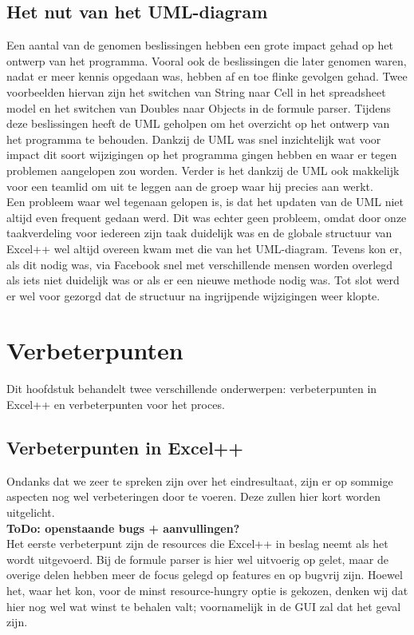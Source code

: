 \documentclass[a4paper,11pt]{article}
\begin{document}
\subsection{Het nut van het UML-diagram}
Een aantal van de genomen beslissingen hebben een grote impact gehad op het ontwerp van het programma. Vooral ook de beslissingen die later genomen waren, nadat er meer kennis opgedaan was, hebben af en toe flinke gevolgen gehad. Twee voorbeelden hiervan zijn het switchen van String naar Cell in het spreadsheet model en het switchen van Doubles naar Objects in de formule parser. Tijdens deze beslissingen heeft de UML geholpen om het overzicht op het ontwerp van het programma te behouden. Dankzij de UML was snel inzichtelijk wat voor impact dit soort wijzigingen op het programma gingen hebben en waar er tegen problemen aangelopen zou worden. Verder is het dankzij de UML ook makkelijk voor een teamlid om uit te leggen aan de groep waar hij precies aan werkt.\\

Een probleem waar wel tegenaan gelopen is, is dat het updaten van de UML niet altijd even frequent gedaan werd. Dit was echter geen probleem, omdat door onze taakverdeling voor iedereen zijn taak duidelijk was en de globale structuur van Excel++ wel altijd overeen kwam met die van het UML-diagram. Tevens kon er, als dit nodig was, via Facebook snel met verschillende mensen worden overlegd als iets niet duidelijk was or als er een nieuwe methode nodig was. Tot slot werd er wel voor gezorgd dat de structuur na ingrijpende wijzigingen weer klopte.

\newpage\section{Verbeterpunten}
Dit hoofdstuk behandelt twee verschillende onderwerpen: verbeterpunten in Excel++ en verbeterpunten voor het proces.\\

\subsection{Verbeterpunten in Excel++}
Ondanks dat we zeer te spreken zijn over het eindresultaat, zijn er op sommige aspecten nog wel verbeteringen door te voeren. Deze zullen hier kort worden uitgelicht.\\

\textbf{ToDo: openstaande bugs + aanvullingen?}\\
Het eerste verbeterpunt zijn de resources die Excel++ in beslag neemt als het wordt uitgevoerd. Bij de formule parser is hier wel uitvoerig op gelet, maar de overige delen hebben meer de focus gelegd op features en op bugvrij zijn. Hoewel het, waar het kon, voor de minst resource-hungry optie is gekozen, denken wij dat hier nog wel wat winst te behalen valt; voornamelijk in de GUI zal dat het geval zijn.\\
\end{document}
